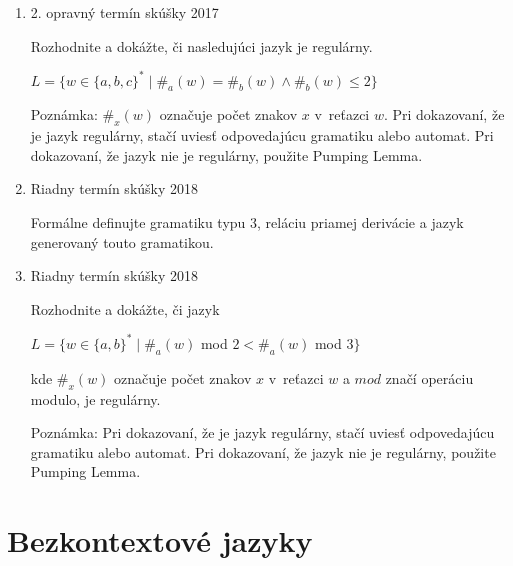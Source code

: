 \documentclass[]{article}
\begin{document}
\begin{enumerate}
		\item 2. opravný termín skúšky 2017
		
		Rozhodnite a dokážte, či nasledujúci jazyk je regulárny.
		
		$L = \{w \in \{a,b,c\}^* \mid \#_a(w) = \#_b(w) \land \#_b(w) \leq 2\}$
		
		Poznámka: $\#_x(w)$ označuje počet znakov $x$ v~reťazci $w$. Pri dokazovaní, že je jazyk regulárny, stačí uviesť odpovedajúcu gramatiku alebo automat. Pri dokazovaní, že jazyk nie je regulárny, použite Pumping Lemma.
		
		\item Riadny termín skúšky 2018
		
		Formálne definujte gramatiku typu 3, reláciu priamej derivácie a jazyk generovaný touto gramatikou.
		
		\item Riadny termín skúšky 2018
		
		Rozhodnite a dokážte, či jazyk
		
		$L = \{w \in \{a,b\}^* \mid \#_a(w)$ mod $2 < \#_a(w)$ mod $3\}$
		
		kde $\#_x(w)$ označuje počet znakov $x$ v~reťazci $w$ a $mod$ značí operáciu modulo, je regulárny.
		
		Poznámka: Pri dokazovaní, že je jazyk regulárny, stačí uviesť odpovedajúcu gramatiku alebo automat. Pri dokazovaní, že jazyk nie je regulárny, použite Pumping Lemma.
		
		
	\end{enumerate}

	\section{Bezkontextové jazyky}
	
\end{document}
